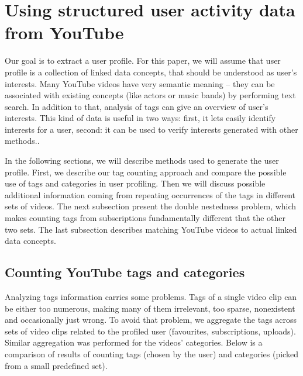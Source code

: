 \section{Using structured user activity data from YouTube}

Our goal is to extract a user profile. For this paper, we will assume that user
profile is a collection of linked data concepts, that should be understood as
user's interests. Many YouTube videos have very semantic meaning -- they can
be associated with existing concepts (like actors or music bands) by performing
text search. In addition to that, analysis of tags can give an overview of user's
interests. This kind of data is useful in two
ways: first, it lets easily identify interests for a user, second: it can be
used to verify interests generated with other methods..

In the following sections, we will describe methods used to generate the user
profile. First, we describe our tag counting approach and compare the possible
use of tags and categories in user profiling. Then we will discuss possible
additional information coming from repeating occurrences of the tags in
different sets of videos. The next subsection present the double
nestedness problem, which makes counting tags from subscriptions fundamentally
different that the other two sets. The last subsection describes matching
YouTube videos to actual linked data concepts.

\subsection{Counting YouTube tags and categories}
Analyzing tags information carries some problems. Tags of a single video clip
can be either too numerous, making many
of them irrelevant, too sparse, nonexistent and occasionally just wrong. To avoid
that problem, we aggregate the tags across sets of video clips related to the
profiled user (favourites, subscriptions, uploads). Similar aggregation was
performed for the videos' categories. Below is a comparison of results of counting
tags (chosen by the user) and categories (picked from a small predefined set).


